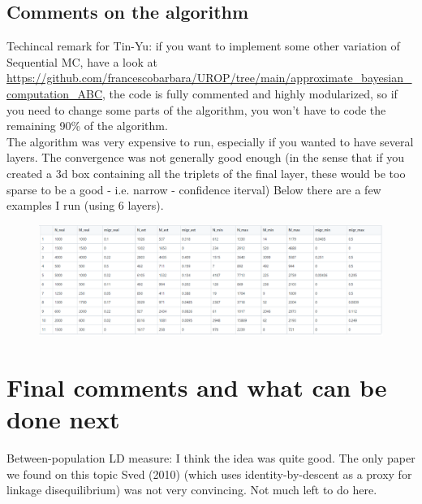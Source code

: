 \documentclass[a4paper,12pt]{article}
\begin{document}
{\begin{enumerate}
 \end{enumerate}
 
 \subsection{Comments on the algorithm}
 Techincal remark for Tin-Yu: if you want to implement some other variation of Sequential MC, have a look at \url{https://github.com/francescobarbara/UROP/tree/main/approximate_bayesian_computation_ABC}, the code is fully commented and highly modularized, so if you need to change some parts of the algorithm, you won't have to code the remaining 90\% of the algorithm.\\
 
 The algorithm was very expensive to run, especially if you wanted to have several layers. The convergence was not generally good enough (in the sense that if you created a 3d box containing all the triplets of the final layer, these would be too sparse to be a good -   i.e. narrow - confidence iterval)
 Below there are a few examples I run (using 6 layers).
 \begin{figure}[H]
    \centering
    \includegraphics[scale=0.55]{20.png}%

\end{figure}%

\section{Final comments and what can be done next}

Between-population LD measure:  I think the idea was quite good. The only paper we found on this topic Sved (2010) (which uses identity-by-descent as a proxy for linkage disequilibrium) was not very convincing. Not much left to do here.\\

}
\end{document}

